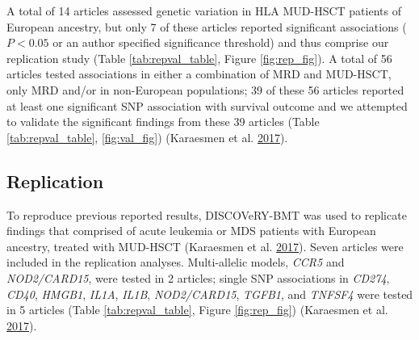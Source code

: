 \documentclass[]{DissertateOSU}
\begin{document}
A total of 14 articles assessed genetic variation in HLA MUD-HSCT
patients of European ancestry, but only 7 of these articles reported
significant associations (\(P < 0.05\) or an author specified
significance threshold) and thus comprise our replication study (Table
\ref{tab:repval_table}, Figure \ref{fig:rep_fig}). A total of 56
articles tested associations in either a combination of MRD and
MUD-HSCT, only MRD and/or in non-European populations; 39 of these 56
articles reported at least one significant SNP association with survival
outcome and we attempted to validate the significant findings from these
39 articles (Table \ref{tab:repval_table}, \ref{fig:val_fig}) (Karaesmen
et al. \protect\hyperlink{ref-Karaesmen_2017}{2017}).

\subsection{Replication}\label{replication}

To reproduce previous reported results, DISCOVeRY-BMT was used to
replicate findings that comprised of acute leukemia or MDS patients with
European ancestry, treated with MUD-HSCT (Karaesmen et al.
\protect\hyperlink{ref-Karaesmen_2017}{2017}). Seven articles were
included in the replication analyses. Multi-allelic models, \emph{CCR5}
and \emph{NOD2/CARD15}, were tested in 2 articles; single SNP
associations in \emph{CD274}, \emph{CD40}, \emph{HMGB1}, \emph{IL1A},
\emph{IL1B}, \emph{NOD2/CARD15}, \emph{TGFB1}, and \emph{TNFSF4} were
tested in 5 articles (Table \ref{tab:repval_table}, Figure
\ref{fig:rep_fig}) (Karaesmen et al.
\protect\hyperlink{ref-Karaesmen_2017}{2017}).
\end{document}
